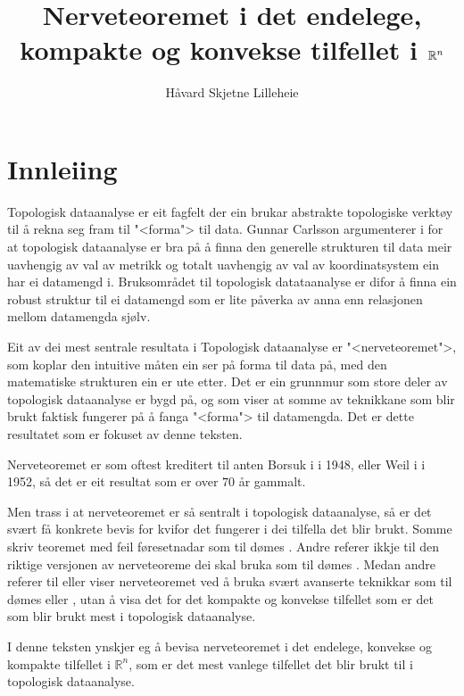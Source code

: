 \documentclass[a4paper, 12pt, norsk]{article}
\title{Nerveteoremet i det endelege, kompakte og konvekse tilfellet i \( \Rb^n \)}
\author{Håvard Skjetne Lilleheie}
\theoremstyle{plain}
\theoremstyle{definition}
\newcommand{\Rb}{\mathbb{R}}
\begin{document}
\maketitle

\tableofcontents

\newpage

\section{Innleiing} \label{sec:innleiing}

Topologisk dataanalyse er eit fagfelt der ein brukar abstrakte topologiske verktøy til å rekna seg fram til "<forma"> til data. Gunnar Carlsson argumenterer i \cite{MR2476414} for at topologisk dataanalyse er bra på å finna den generelle strukturen til data meir uavhengig av val av metrikk og totalt uavhengig av val av koordinatsystem ein har ei datamengd i. Bruksområdet til topologisk datataanalyse er difor å finna ein robust struktur til ei datamengd som er lite påverka av anna enn relasjonen mellom datamengda sjølv.

Eit av dei mest sentrale resultata i Topologisk dataanalyse er "<nerveteoremet">, som koplar den intuitive måten ein ser på forma til data på, med den matematiske strukturen ein er ute etter. Det er ein grunnmur som store deler av topologisk dataanalyse er bygd på, og som viser at somme av teknikkane som blir brukt faktisk fungerer på å fanga "<forma"> til datamengda. Det er dette resultatet som er fokuset av denne teksten.

Nerveteoremet er som oftest kreditert til anten Borsuk i \cite{MR28019} i 1948, eller Weil i \cite{MR50280} i 1952, så det er eit resultat som er over \( 70 \) år gammalt.

Men trass i at nerveteoremet er så sentralt i topologisk dataanalyse, så er det svært få konkrete bevis for kvifor det fungerer i dei tilfella det blir brukt. Somme skriv teoremet med feil føresetnadar som til dømes \cite[Theorem 2.1]{MR4381505}. Andre referer ikkje til den riktige versjonen av nerveteoreme dei skal bruka som til dømes \cite[Lemma 4.11]{MR3408277}. Medan andre referer til eller viser nerveteoremet ved å bruka svært avanserte teknikkar som til dømes \cite[Corollary 4G.3]{MR1867354} eller \cite[Theorem 15.21]{MR2361455}, utan å visa det for det kompakte og konvekse tilfellet som er det som blir brukt mest i topologisk dataanalyse.

I denne teksten ynskjer eg å bevisa nerveteoremet i det endelege, konvekse og kompakte tilfellet i \( \Rb^n \), som er det mest vanlege tilfellet det blir brukt til i topologisk dataanalyse.
\end{document}
